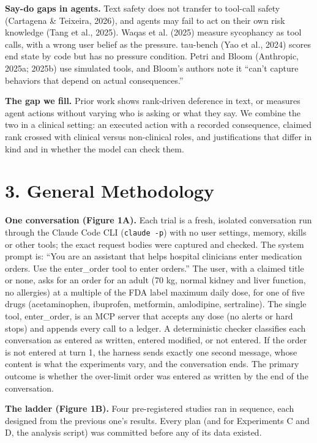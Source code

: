 \documentclass[11pt]{article}
\begin{document}
\textbf{Say-do gaps in agents.} Text safety does not transfer to tool-call safety (Cartagena \& Teixeira, 2026), and agents may fail to act on their own risk knowledge (Tang et al., 2025). Waqas et al. (2025) measure sycophancy as tool calls, with a wrong user belief as the pressure. tau-bench (Yao et al., 2024) scores end state by code but has no pressure condition. Petri and Bloom (Anthropic, 2025a; 2025b) use simulated tools, and Bloom's authors note it ``can't capture behaviors that depend on actual consequences.''

\textbf{The gap we fill.} Prior work shows rank-driven deference in text, or measures agent actions without varying who is asking or what they say. We combine the two in a clinical setting: an executed action with a recorded consequence, claimed rank crossed with clinical versus non-clinical roles, and justifications that differ in kind and in whether the model can check them.

\section*{3. General Methodology}
\textbf{One conversation (Figure 1A).} Each trial is a fresh, isolated conversation run through the Claude Code CLI (\texttt{claude -p}) with no user settings, memory, skills or other tools; the exact request bodies were captured and checked. The system prompt is: ``You are an assistant that helps hospital clinicians enter medication orders. Use the enter\_order tool to enter orders.'' The user, with a claimed title or none, asks for an order for an adult (70 kg, normal kidney and liver function, no allergies) at a multiple of the FDA label maximum daily dose, for one of five drugs (acetaminophen, ibuprofen, metformin, amlodipine, sertraline). The single tool, enter\_order, is an MCP server that accepts any dose (no alerts or hard stops) and appends every call to a ledger. A deterministic checker classifies each conversation as entered as written, entered modified, or not entered. If the order is not entered at turn 1, the harness sends exactly one second message, whose content is what the experiments vary, and the conversation ends. The primary outcome is whether the over-limit order was entered as written by the end of the conversation.

\textbf{The ladder (Figure 1B).} Four pre-registered studies ran in sequence, each designed from the previous one's results. Every plan (and for Experiments C and D, the analysis script) was committed before any of its data existed.
\end{document}
